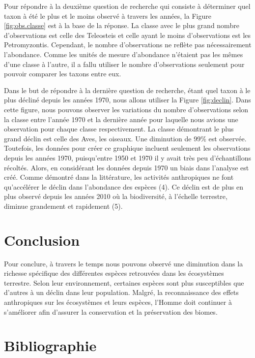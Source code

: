 \documentclass[9pt,twocolumn,twoside,]{pnas-new}
\begin{document}
Pour répondre à la deuxième question de recherche qui consiste à
déterminer quel taxon à été le plus et le moins observé à travers les
années, la Figure \ref{fig:obs.classe} est à la base de la réponse. La
classe avec le plus grand nombre d'observations est celle des Teleosteis
et celle ayant le moins d'observations est les Petromyzontis. Cependant,
le nombre d'observations ne reflète pas nécessairement l'abondance.
Comme les unités de mesure d'abondance n'étaient pas les mêmes d'une
classe à l'autre, il a fallu utiliser le nombre d'observations seulement
pour pouvoir comparer les taxons entre eux.

Dans le but de répondre à la dernière question de recherche, étant quel
taxon à le plus décliné depuis les années 1970, nous allons utiliser la
Figure \ref{fig:declin}. Dans cette figure, nous pouvons observer les
variations du nombre d'observations selon la classe entre l'année 1970
et la dernière année pour laquelle nous avions une observation pour
chaque classe respectivement. La classe démontrant le plus grand déclin
est celle des Aves, les oiseaux. Une diminution de 99\% est observée.
Toutefois, les données pour créer ce graphique incluent seulement les
observations depuis les années 1970, puisqu'entre 1950 et 1970 il y
avait très peu d'échantillons récoltés. Alors, en considérant les
données depuis 1970 un biais dans l'analyse est créé. Comme démontré
dans la littérature, les activités anthropiques ne font qu'accélérer le
déclin dans l'abondance des espèces (4). Ce déclin est de plus en plus
observé depuis les années 2010 où la biodiversité, à l'échelle
terrestre, diminue grandement et rapidement (5).

\section{Conclusion}\label{conclusion}

Pour conclure, à travers le temps nous pouvons observé une diminution
dans la richesse spécifique des différentes espèces retrouvées dans les
écosystèmes terrestre. Selon leur environnement, certaines espèces sont
plus susceptibles que d'autres à un déclin dans leur population. Malgré,
la reconnaissance des effets anthropiques sur les écosystèmes et leurs
espèces, l'Homme doit continuer à s'améliorer afin d'assurer la
conservation et la préservation des biomes.

\section*{Bibliographie}\label{bibliographie}
\end{document}
